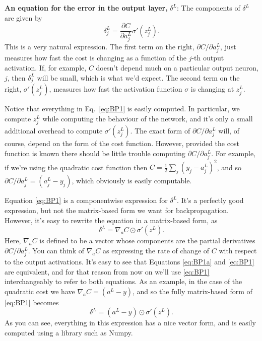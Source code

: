 \documentclass[a4paper,twoside,10pt]{book}
\begin{document}
\textbf{An equation for the error in the output layer,} $\delta^L$: The components of $\delta^L$ are given by
\begin{equation}
	\delta^L_j = \frac{\partial C}{\partial a^L_j} \sigma'(z^L_j).
	\tag{BP1}\label{eq:BP1}
\end{equation}
This is a very natural expression. The first term on the right, $\partial{}C/\partial{}a^L_j$, just measures how fast the cost is changing as a function of the $j$-th output activation. If, for example, $C$ doesn't depend much on a particular output neuron, $j$, then $\delta^L_j$ will be small, which is what we'd expect. The second term on the right, $\sigma'(z^L_j)$, measures how fast the activation function $\sigma$ is changing at $z^L_j$.

Notice that everything in Eq.~\ref{eq:BP1} is easily computed. In particular, we compute $z^L_j$ while computing the behaviour of the network, and it's only a small additional overhead to compute $\sigma'(z^L_j)$. The exact form of $\partial{}C/\partial{}a^L_j$ will, of course, depend on the form of the cost function. However, provided the cost function is known there should be little trouble computing $\partial{}C/\partial{}a^L_j$. For example, if we're using the quadratic cost function then $C=\frac12\sum_j(y_j-a^L_j)^2$, and so $\partial{}C/\partial{}a^L_j=(a^L_j-y_j)$, which obviously is easily computable.

Equation \ref{eq:BP1} is a componentwise expression for $\delta^L$. It's a perfectly good expression, but not the matrix-based form we want for backpropagation. However, it's easy to rewrite the equation in a matrix-based form, as
\begin{equation}
\delta^L = \nabla_a C \odot \sigma'(z^L).
\tag{BP1a}\label{eq:BP1a}
\end{equation}
Here, $\nabla_a C$ is defined to be a vector whose components are the partial derivatives $\partial{}C/\partial{}a^L_j$. You can think of $\nabla_a C$ as expressing the rate of change of $C$ with respect to the output activations. It's easy to see that Equations \ref{eq:BP1a} and \ref{eq:BP1} are equivalent, and for that reason from now on we'll use \ref{eq:BP1} interchangeably to refer to both equations. As an example, in the case of the quadratic cost we have $\nabla_a C =(a^L-y)$, and so the fully matrix-based form of \ref{eq:BP1} becomes
\begin{equation}
\delta^L = (a^L-y) \odot \sigma'(z^L).
\tag{30}\label{eq:30}
\end{equation}
As you can see, everything in this expression has a nice vector form, and is easily computed using a library such as Numpy.
\end{document}
